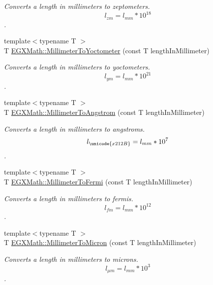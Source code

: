 \begin{DoxyCompactItemize}
\begin{DoxyCompactList}\small\item\em Converts a length in millimeters to zeptometers. \[ l_{zm}=l_{mm} * 10^{18} \]. \end{DoxyCompactList}\item 
{\footnotesize template$<$typename T $>$ }\\T \mbox{\hyperlink{group___e_g_x_math-_conversions-_length_conversions-_s_i-_millimeter-_s_i_ga7f8020bb633d6ed2cd874a8c66d2893d}{E\+G\+X\+Math\+::\+Millimeter\+To\+Yoctometer}} (const T length\+In\+Millimeter)
\begin{DoxyCompactList}\small\item\em Converts a length in millimeters to yoctometers. \[ l_{ym}=l_{mm} * 10^{21} \]. \end{DoxyCompactList}\item 
{\footnotesize template$<$typename T $>$ }\\T \mbox{\hyperlink{group___e_g_x_math-_conversions-_length_conversions-_s_i-_millimeter-_non-_s_i_ga40e4659f4689e5be54f8e28fd8ce0008}{E\+G\+X\+Math\+::\+Millimeter\+To\+Angstrom}} (const T length\+In\+Millimeter)
\begin{DoxyCompactList}\small\item\em Converts a length in millimeters to angstroms. \[ l_{\unicode{x212B}}=l_{mm} * 10^{7} \]. \end{DoxyCompactList}\item 
{\footnotesize template$<$typename T $>$ }\\T \mbox{\hyperlink{group___e_g_x_math-_conversions-_length_conversions-_s_i-_millimeter-_non-_s_i_gaeb57dff8b2e092b5a655ffdd9960897d}{E\+G\+X\+Math\+::\+Millimeter\+To\+Fermi}} (const T length\+In\+Millimeter)
\begin{DoxyCompactList}\small\item\em Converts a length in millimeters to fermis. \[ l_{fm}=l_{mm} * 10^{12} \]. \end{DoxyCompactList}\item 
{\footnotesize template$<$typename T $>$ }\\T \mbox{\hyperlink{group___e_g_x_math-_conversions-_length_conversions-_s_i-_millimeter-_non-_s_i_ga47eac74d2eeec20afc801e61d53f67a0}{E\+G\+X\+Math\+::\+Millimeter\+To\+Micron}} (const T length\+In\+Millimeter)
\begin{DoxyCompactList}\small\item\em Converts a length in millimeters to microns. \[ l_{\mu m}=l_{mm} * 10^{3} \]. \end{DoxyCompactList}\item 

\end{DoxyCompactItemize}
